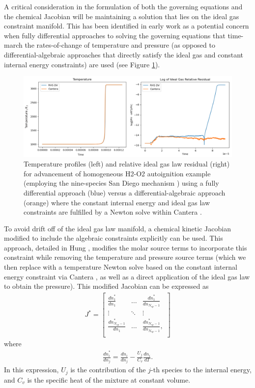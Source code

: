 A critical consideration in the formulation of both the governing equations
and the chemical Jacobian will be maintaining a solution
that lies on the ideal gas constraint manifold. This
has been identified in early work as a potential concern when fully
differential approaches to solving the governing equations that time-march
the rates-of-change of temperature and pressure (as opposed to
differential-algebraic approaches that directly satisfy the ideal gas and
constant internal energy constraints) are used (see Figure \ref{fig:autoignition_drift}).
\begin{figure}
\centering
\includegraphics[width=0.8\linewidth,trim=4 4 4 4,clip]{figures/autoignition_drift.png}
	\caption{Temperature profiles (left) and relative ideal gas law residual (right)
		 for advancement of homogeneous H2-O2 autoignition example (employing the nine-species
		 San Diego mechanism \cite{sandiego}) using a fully differential approach (blue) versus a differential-algebraic
		 approach (orange) where the constant internal energy and ideal gas law constraints are fulfilled
		 by a Newton solve within Cantera \cite{cantera}.}
\label{fig:autoignition_drift}
\end{figure}
To avoid drift off of the ideal gas law manifold, a chemical
kinetic Jacobian modified to include the algebraic constraints explicitly can
be used. This approach, detailed in Hung \cite{hung2003algorithms}, modifies the molar source terms to incorporate
this constraint while removing the temperature and pressure source terms (which
we then replace with a temperature Newton solve based on the constant internal
energy constraint via Cantera \cite{cantera}, as well as a direct application of the ideal
gas law to obtain the pressure). This modified Jacobian can be expressed as
\begin{align}
J^{*} = \begin{bmatrix}	\frac{d\dot{n}_{1}^{*}}{dn_{1}} & \hdots & \frac{d\dot{n}_{1}^{*}}{dn_{N_{sp}-1}} \\
	                \vdots & \ddots & \vdots \\
	                \frac{d\dot{n}_{N_{sp}-1}^{*}}{dn_{1}} & \hdots & \frac{d\dot{n}_{N_{sp}-1}^{*}}{dn_{N_{sp}-1}}, \\
\end{bmatrix} \label{eq:diff_alg_jac}
\end{align}
where
\begin{align}
\frac{d\dot{n}_{i}^{*}}{dn_{j}} = \frac{d\dot{n}_{i}}{dn_{j}} - \frac{U_{j}}{C_{v}}\frac{d\dot{n}_{i}}{dT}.
\end{align}
In this expression, $U_{j}$ is the contribution of the $j$-th species to the
internal energy, and $C_{v}$ is the specific heat of the mixture at constant
volume.

